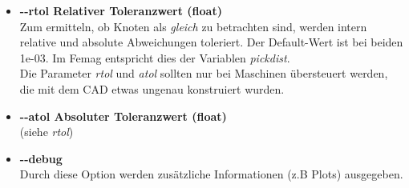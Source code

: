 \documentclass[10pt, a4paper,german]{scrartcl}
\newcommand{\Slanted}[1]{{\normalfont\slshape #1}}
\newcommand{\LongArg}[1]{\mbox{{-}{-}#1}}
\begin{document}
\begin{itemize}
\item {\bfseries{\LongArg{rtol} Relativer Toleranzwert (float)}}\\
		Zum ermitteln, ob Knoten als \Slanted{gleich} zu betrachten sind, werden intern relative
		und absolute Abweichungen toleriert. Der Default-Wert ist bei beiden 1e-03. Im Femag
		entspricht dies der Variablen \Slanted{pickdist}.\\
		Die Parameter \Slanted{rtol} und \Slanted{atol} sollten nur bei Maschinen übersteuert 
		werden, die mit dem CAD etwas ungenau konstruiert wurden.
		
\item {\bfseries{\LongArg{atol} Absoluter Toleranzwert (float)}}\\
		(siehe \Slanted{rtol})
		
\item {\bfseries{\LongArg{debug}}}\\
		Durch diese Option werden zusätzliche Informationen (z.B Plots) ausgegeben.
\end{itemize}
\end{document}
